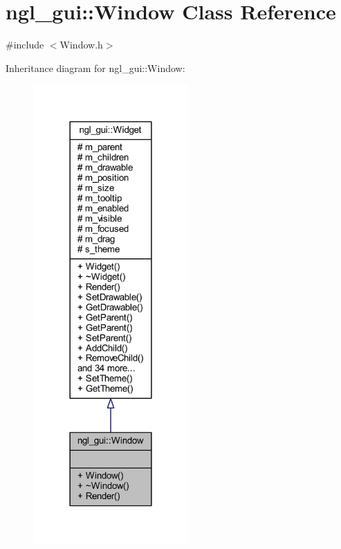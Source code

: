 \hypertarget{classngl__gui_1_1_window}{}\section{ngl\+\_\+gui\+:\+:Window Class Reference}
\label{classngl__gui_1_1_window}


{\ttfamily \#include $<$Window.\+h$>$}



Inheritance diagram for ngl\+\_\+gui\+:\+:Window\+:\nopagebreak
\begin{figure}[H]
\begin{center}
\leavevmode
\includegraphics[width=168pt]{classngl__gui_1_1_window__inherit__graph}
\end{center}
\end{figure}


